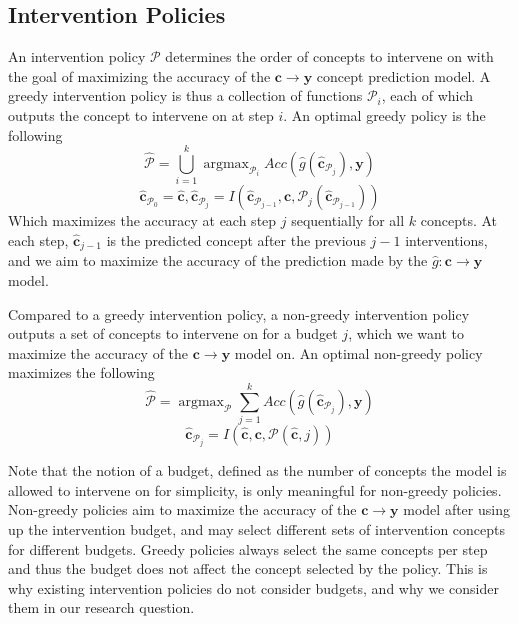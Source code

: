 \subsection{Intervention Policies}

An intervention policy $\mathcal{P}$ determines the order of concepts to intervene 
on with the goal of maximizing the accuracy of the $\mathbf{c} \to \mathbf{y}$ concept prediction model.
A greedy intervention policy is thus a collection of functions $\mathcal{P}_i$, each
of which outputs the concept to intervene on at step $i$. An optimal greedy policy is the following
\[\hat{\mathcal{P}} = \bigcup_{i=1}^k \mathop{\mathrm{argmax}}_{\mathcal{P}_i} Acc(\hat{g}(\hat{\mathbf{c}}_{\mathcal{P}_j}), \mathbf{y}) \]
\[\hat{\mathbf{c}}_{\mathcal{P}_0} = \hat{\mathbf{c}}, \hat{\mathbf{c}}_{\mathcal{P}_j} = I(\hat{\mathbf{c}}_{\mathcal{P}_{j-1}}, \mathbf{c}, \mathcal{P}_j(\hat{\mathbf{c}}_{\mathcal{P}_{j-1}}))\]
Which maximizes the accuracy at each step $j$ sequentially
for all $k$ concepts. At each
step, $\hat{\mathbf{c}}_{j-1}$ is 
the predicted concept after the previous $j-1$ interventions,
and we aim to maximize the accuracy of the prediction made by the
$\hat{g}: \mathbf{c} \to \mathbf{y}$ model.


Compared to a greedy intervention policy, a non-greedy intervention 
policy outputs a set of concepts to intervene on for a budget $j$,
which we want to maximize the accuracy of the $\mathbf{c} \to \mathbf{y}$ model on. 
An optimal non-greedy policy maximizes the following
\[\hat{\mathcal{P}} = \mathop{\mathrm{argmax}}_{\mathcal{P}} \sum_{j=1}^k Acc(\hat{g}(\hat{\mathbf{c}}_{\mathcal{P}_j}), \mathbf{y}) \]
\[\hat{\mathbf{c}}_{\mathcal{P}_j} = I(\hat{\mathbf{c}}, \mathbf{c}, \mathcal{P}(\hat{\mathbf{c}}, j))\]

Note that the notion of a budget, defined as the number
of concepts the model is allowed to intervene on for simplicity, is only
meaningful for non-greedy policies. Non-greedy policies aim
to maximize the accuracy of the $\mathbf{c} \to \mathbf{y}$ model after using up the intervention budget,
and may select different sets of intervention concepts 
for different budgets. Greedy policies always select the same
concepts per step and thus the budget does not 
affect the concept selected by the policy.
This is why existing intervention policies do not consider
budgets, and why we consider them in our research question.

